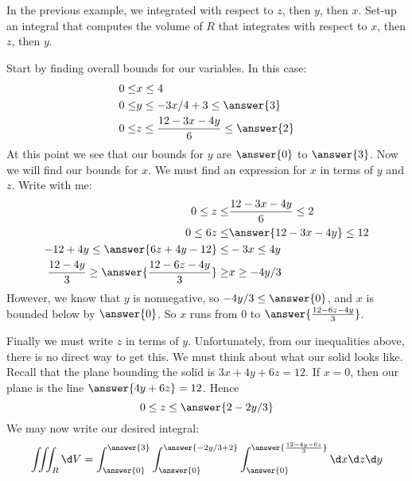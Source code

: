 \documentclass{ximera}
\begin{document}
\begin{question}
  In the previous example, we integrated with respect to $z$, then
  $y$, then $x$. Set-up an integral that computes the volume of $R$
  that integrates with respect to $x$, then $z$, then $y$.
  \begin{prompt}
    Start by finding overall bounds for our variables. In this case:
    \begin{align*}
      0\le &x \le 4\\
      0\le &y \le -3x/4+3 \le \answer{3}\\
      0\le &z \le \frac{12-3x-4y}{6}\le \answer{2}
    \end{align*}
    At this point we see that our bounds for $y$ are $\answer{0}$ to
    $\answer{3}$. Now we will find our bounds for $x$. We must find an
    expression for $x$ in terms of $y$ and $z$. Write with me:
    \begin{align*}
      0\le z \le &\frac{12-3x-4y}{6}\le 2\\
      0\le 6z \le &\answer{12-3x-4y} \le 12\\
      -12+4y\le \answer{6z+4y-12}\le &-3x \le 4y\\
      \frac{12-4y}{3}\ge \answer{\frac{12-6z-4y}{3}}\ge &x \ge -4y/3
    \end{align*}
    However, we know that $y$ is nonnegative, so $-4y/3\le \answer{0}$, and $x$
    is bounded below by $\answer{0}$. So $x$ runs from $0$ to
    $\answer{\frac{12-6z-4y}{3}}$.

    Finally we must write $z$ in terms of $y$. Unfortunately, from our
    inequalities above, there is no direct way to get this. We must
    think about what our solid looks like. Recall that the plane
    bounding the solid is $3x + 4y + 6z = 12$. If $x=0$, then our
    plane is the line $\answer{4y+6z}=12$. Hence
    \[
    0\le z \le \answer{2-2y/3}
    \]
    We may now write our desired integral:
    \[
    \iiint_R \d V = \int_{\answer{0}}^{\answer{3}}\int_{\answer{0}}^{\answer{-2y/3+2}} \int_{\answer{0}}^{\answer{\frac{12-4y-6z}{3}}} \d x \d z \d y
    \]
  \end{prompt}
\end{question}
\end{document}
